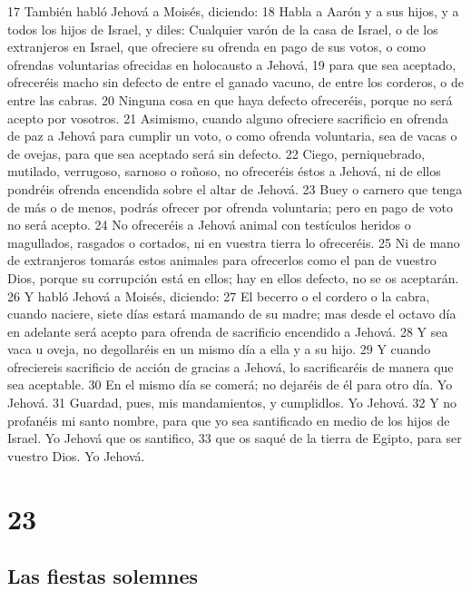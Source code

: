 17 También habló Jehová a Moisés, diciendo:
18 Habla a Aarón y a sus hijos, y a todos los hijos de Israel, y diles: Cualquier varón de la casa de Israel, o de los extranjeros en Israel, que ofreciere su ofrenda en pago de sus votos, o como ofrendas voluntarias ofrecidas en holocausto a Jehová,
19 para que sea aceptado, ofreceréis macho sin defecto de entre el ganado vacuno, de entre los corderos, o de entre las cabras.
20 Ninguna cosa en que haya defecto ofreceréis, porque no será acepto por vosotros.
21 Asimismo, cuando alguno ofreciere sacrificio en ofrenda de paz a Jehová para cumplir un voto, o como ofrenda voluntaria, sea de vacas o de ovejas, para que sea aceptado será sin defecto.
22 Ciego, perniquebrado, mutilado, verrugoso, sarnoso o roñoso, no ofreceréis éstos a Jehová, ni de ellos pondréis ofrenda encendida sobre el altar de Jehová.
23 Buey o carnero que tenga de más o de menos, podrás ofrecer por ofrenda voluntaria; pero en pago de voto no será acepto.
24 No ofreceréis a Jehová animal con testículos heridos o magullados, rasgados o cortados, ni en vuestra tierra lo ofreceréis.
25 Ni de mano de extranjeros tomarás estos animales para ofrecerlos como el pan de vuestro Dios, porque su corrupción está en ellos; hay en ellos defecto, no se os aceptarán.
26 Y habló Jehová a Moisés, diciendo:
27 El becerro o el cordero o la cabra, cuando naciere, siete días estará mamando de su madre; mas desde el octavo día en adelante será acepto para ofrenda de sacrificio encendido a Jehová.
28 Y sea vaca u oveja, no degollaréis en un mismo día a ella y a su hijo.
29 Y cuando ofreciereis sacrificio de acción de gracias a Jehová, lo sacrificaréis de manera que sea aceptable.
30 En el mismo día se comerá; no dejaréis de él para otro día. Yo Jehová.
31 Guardad, pues, mis mandamientos, y cumplidlos. Yo Jehová.
32 Y no profanéis mi santo nombre, para que yo sea santificado en medio de los hijos de Israel. Yo Jehová que os santifico,
33 que os saqué de la tierra de Egipto, para ser vuestro Dios. Yo Jehová.

\chapter{23}

\section*{Las fiestas solemnes}

